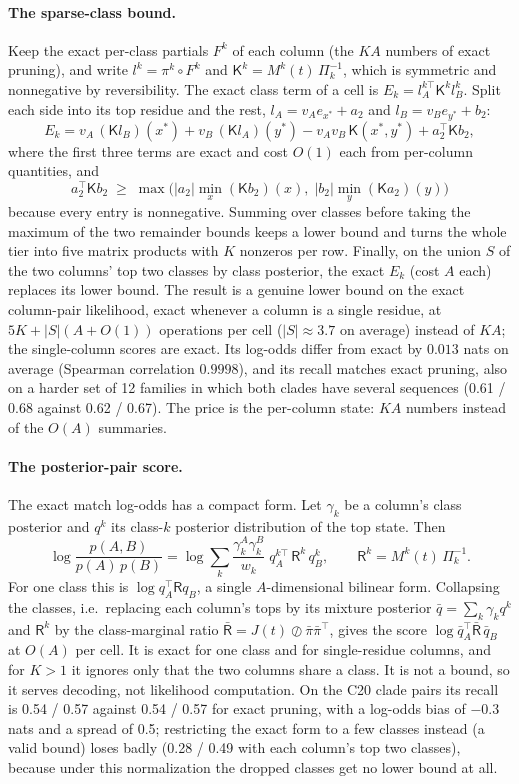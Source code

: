 \documentclass[11pt]{article}
\begin{document}
\paragraph{The sparse-class bound.} Keep the exact per-class partials $F^k$ of
each column (the $KA$ numbers of exact pruning), and write
$l^k=\pi^k\circ F^k$ and $\mathsf K^k=M^k(t)\,\Pi_k^{-1}$, which is symmetric and
nonnegative by reversibility. The exact class term of a cell is
$E_k=l_A^{k\top}\mathsf K^kl_B^k$. Split each side into its top residue and the
rest, $l_A=v_Ae_{x^*}+a_2$ and $l_B=v_Be_{y^*}+b_2$:
\[
E_k=v_A\,(\mathsf K l_B)(x^*)+v_B\,(\mathsf K l_A)(y^*)-v_Av_B\,\mathsf K(x^*,y^*)
+a_2^\top\mathsf K b_2 ,
\]
where the first three terms are exact and cost $O(1)$ each from per-column
quantities, and
\[
a_2^\top\mathsf Kb_2\;\ge\;\max\big(|a_2|\min_x(\mathsf Kb_2)(x),\;|b_2|\min_y(\mathsf Ka_2)(y)\big)
\]
because every entry is nonnegative. Summing
over classes before taking the maximum of the two remainder bounds keeps a
lower bound and turns the whole tier into five matrix products with $K$
nonzeros per row. Finally, on the union $S$ of the two columns' top two classes
by class posterior, the exact $E_k$ (cost $A$ each) replaces its lower bound.
The result is a genuine lower bound on the exact column-pair likelihood,
exact whenever a column is a single residue, at $5K+|S|(A+O(1))$ operations per
cell ($|S|\approx3.7$ on average) instead of $KA$; the single-column scores are
exact. Its log-odds differ from exact by $0.013$ nats on average (Spearman
correlation $0.9998$), and its recall matches exact pruning, also on a harder
set of 12 families in which both clades have several sequences (0.61 / 0.68
against 0.62 / 0.67). The price is the per-column state: $KA$ numbers instead
of the $O(A)$ summaries.

\paragraph{The posterior-pair score.} The exact match log-odds has a compact form.
Let $\gamma_k$ be a column's class posterior and $q^k$ its class-$k$ posterior
distribution of the top state. Then
\[
\log\frac{p(A,B)}{p(A)\,p(B)}
=\log\sum_k\frac{\gamma^A_k\gamma^B_k}{w_k}\;q^{k\top}_A\,\mathsf R^k\,q^k_B,
\qquad \mathsf R^k=M^k(t)\,\Pi_k^{-1}.
\]
For one class this is $\log q_A^\top\mathsf Rq_B$, a single $A$-dimensional
bilinear form. Collapsing the classes, i.e.\ replacing each column's tops by its
mixture posterior $\bar q=\sum_k\gamma_kq^k$ and $\mathsf R^k$ by the
class-marginal ratio $\bar{\mathsf R}=J(t)\oslash\bar\pi\bar\pi^\top$, gives the
score $\log\bar q_A^\top\bar{\mathsf R}\,\bar q_B$ at $O(A)$ per cell. It is
exact for one class and for single-residue columns, and for $K>1$ it ignores
only that the two columns share a class. It is not a bound, so it serves
decoding, not likelihood computation. On the C20 clade pairs its recall is
0.54 / 0.57 against 0.54 / 0.57 for exact pruning, with a log-odds bias of
$-0.3$ nats and a spread of 0.5; restricting the exact form to a few classes
instead (a valid bound) loses badly (0.28 / 0.49 with each column's top two
classes), because under this normalization the dropped classes get no lower
bound at all.
\end{document}
